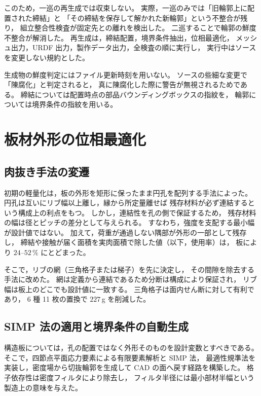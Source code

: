 \documentclass[a4paper,10pt,twocolumn]{ltjsarticle}
\begin{document}
このため，一巡の再生成では収束しない。
実際，一巡のみでは「旧輪郭上に配置された締結」と
「その締結を保存して解かれた新輪郭」という不整合が残り，
組立整合性検査が固定先との離れを検出した。
二巡することで輪郭の鮮度不整合が解消した。
再生成は，締結配置，境界条件抽出，位相最適化，
メッシュ出力，URDF 出力，製作データ出力，全検査の順に実行し，
実行中はソースを変更しない規約とした。

生成物の鮮度判定にはファイル更新時刻を用いない。
ソースの些細な変更で「陳腐化」と判定されると，
真に陳腐化した際に警告が無視されるためである。
締結については配置時点の部品バウンディングボックスの指紋を，
輪郭については境界条件の指紋を用いる。

\section{板材外形の位相最適化}

\subsection{肉抜き手法の変遷}

初期の軽量化は，板の外形を矩形に保ったまま円孔を配列する手法によった。
円孔は互いにリブ幅以上離し，縁から所定量離せば
残存材料が必ず連結するという構成上の利点をもつ。
しかし，連結性を孔の側で保証するため，
残存材料の幅は径とピッチの差分として与えられる。
すなわち，強度を支配する最小幅が設計値ではない。
加えて，荷重が通過しない隅部が外形の一部として残存し，
締結や接触が届く面積を実肉面積で除した値（以下，使用率）は，
板により $24$--$52\,\%$ にとどまった。

そこで，リブの網（三角格子または梯子）を先に決定し，
その間隙を除去する手法に改めた。
網は定義から連結であるため分断は構成により保証され，
リブ幅は板上のどこでも設計値に一致する。
三角格子は面内せん断に対して有利であり，
6 種 11 枚の置換で $227\,$g を削減した。

\subsection{SIMP 法の適用と境界条件の自動生成}

構造板については，孔の配置ではなく外形そのものを設計変数とすべきである。
そこで，四節点平面応力要素による有限要素解析と SIMP 法\cite{bendsoe2003}，
最適性規準法\cite{sigmund2001,andreassen2011}を実装し，密度場から切抜輪郭を生成して
CAD の面へ戻す経路を構築した。
格子依存性は密度フィルタ\cite{sigmund2007}により除去し，
フィルタ半径には最小部材半幅という製造上の意味を与えた。
\end{document}
